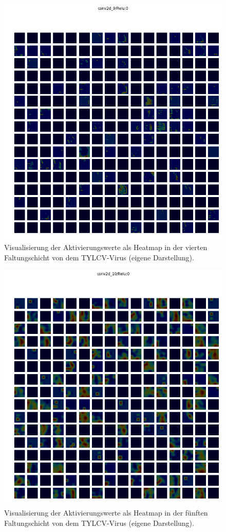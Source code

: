 \begin{figure}[h!]
	\centering
	\includegraphics[width=\textwidth]{visualisierungen/yellow/heapmap_mit/conv2d_9.png}
	\caption{Visualisierung der Aktivierungswerte als Heatmap in der vierten Faltungschicht von dem TYLCV-Virus (eigene Darstellung).}
	\label{}
\end{figure}

\begin{figure}[h!]
	\centering
	\includegraphics[width=\textwidth]{visualisierungen/yellow/heapmap_mit/conv2d_10.png}
	\caption{Visualisierung der Aktivierungswerte als Heatmap in der fünften Faltungschicht von dem TYLCV-Virus (eigene Darstellung).}
	\label{}
\end{figure}
